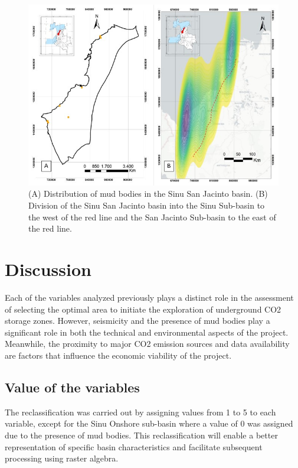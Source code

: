 \documentclass{ifacconf}
\begin{document}
\begin{figure}[h]
	\centering
	\includegraphics[width=0.8\linewidth]{img/Volcanesdelodo}
	\caption[Volcanes]{(A) Distribution of mud bodies in the Sinu San Jacinto basin. (B) Division of the Sinu San Jacinto basin into the Sinu Sub-basin to the west of the red line and the San Jacinto Sub-basin to the east of the red line.}
	\label{fig:volcanesdelodo}
\end{figure}

\section{Discussion}
Each of the variables analyzed previously plays a distinct role in the assessment of selecting the optimal area to initiate the exploration of underground CO2 storage zones. However, seismicity and the presence of mud bodies play a significant role in both the technical and environmental aspects of the project. Meanwhile, the proximity to major CO2 emission sources and data availability are factors that influence the economic viability of the project.

\subsection{Value of the variables}
The reclassification was carried out by assigning values from 1 to 5 to each variable, except for the Sinu Onshore sub-basin where a value of 0 was assigned due to the presence of mud bodies. This reclassification will enable a better representation of specific basin characteristics and facilitate subsequent processing using raster algebra.
\end{document}
